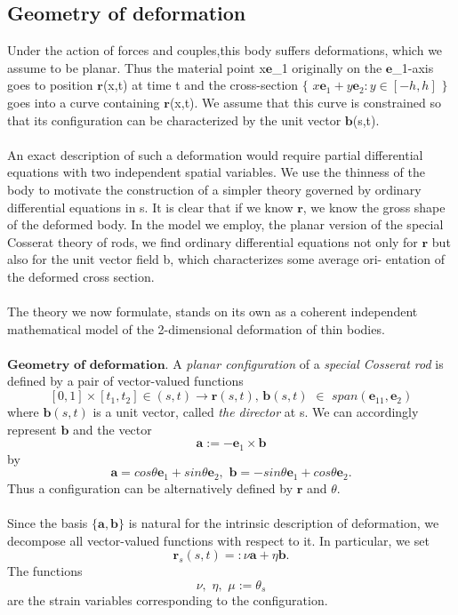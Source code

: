 \documentclass[12pt]{article}
\begin{document}
\subsection{Geometry of deformation}
Under the action of forces and couples,this body suffers deformations, which we assume to be planar. Thus the material point x$\mathbf{e}$_1 originally on the $\mathbf{e}$_1-axis goes to position $\mathbf{r}$(x,t) at time t and the cross-section  $\{$
$x\mathbf{e}_1 + y\mathbf{e}_2:y \in[-h,h]$ 
$\}$ goes into a curve containing $\mathbf{r}$(x,t). We assume that this curve is constrained so that its configuration can be characterized by the unit vector $\mathbf{b}$(s,t).
\\\\
An exact description of such a deformation would require partial differential equations with two independent spatial variables. We use the thinness of the body to motivate the construction of a simpler theory governed by ordinary differential equations in s. It is clear that if we know $\mathbf{r}$, we know the gross shape of the deformed body. In the model we employ, the planar version of the special Cosserat theory of rods, we find ordinary differential equations not only for $\mathbf{r}$ but also for the unit vector field b, which characterizes some average ori- entation of the deformed cross section. 
\\\\
The theory we now formulate, stands on its own as a coherent independent mathematical model of the 2-dimensional deformation of thin bodies.
\\\\
$\mathbf{Geometry}\,\,\mathbf{of}\,\,\mathbf{deformation}.$ A \emph{planar configuration} of a \emph{special Cosserat rod} is defined by a pair of vector-valued functions
\[[0,1] × [t_1,t_2] \in (s,t) → \mathbf{r}(s,t),\,\mathbf{b}(s,t)\,\,\in\,\,span(\mathbf{e}_11,\mathbf{e}_2)\]
where $\mathbf{b}(s,t)$ is a unit vector, called \emph{the director} at s. We can accordingly
represent $\mathbf{b}$ and the vector 
\[ \mathbf{a} := −\mathbf{e}_1 \times \mathbf{b}\]
by 
\[ \mathbf{a}=cos\theta\mathbf{e}_1+sin\theta\mathbf{e}_2,\,\,\mathbf{b}=−sin\theta\mathbf{e}_1+cos\theta\mathbf{e}_2.\]
Thus a configuration can be alternatively defined by $\mathbf{r}$ and $\theta$.
\\\\
Since the basis $\{\mathbf{a},\mathbf{b}\}$ is natural for the intrinsic description of deformation, we decompose all vector-valued functions with respect to it. In
particular, we set
\[ \mathbf{r}_s(s,t) =: \nu\mathbf{a} + \eta\mathbf{b}. \]
The functions
\[ \nu,\,\,\eta,\,\,\mu:= \theta_s \]
are the strain variables corresponding to the configuration. 

\cite{julicher}
\end{document}
